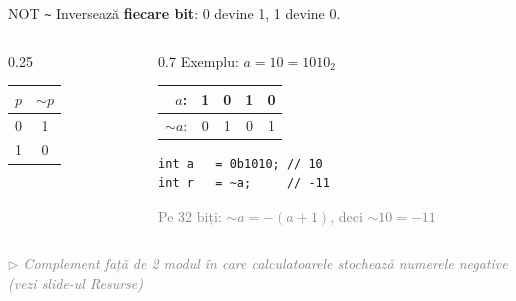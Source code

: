 \documentclass{beamer}
\newcommand{\beginnote}[1]{%
  \vfill
  {\footnotesize\textcolor{gray}{\textit{$\triangleright$ #1 (vezi slide-ul \emph{Resurse})}}}%
}
\begin{document}
\begin{frame}[fragile]{NOT \textemdash{} \texttt{\textasciitilde}}
  Inversează \textbf{fiecare bit}: 0 devine 1, 1 devine 0.
  \bigskip
  \begin{columns}[T]
    \begin{column}{0.25\textwidth}
      \begin{center}
      \begin{tabular}{cc}
        \toprule
        $p$ & $\sim p$ \\
        \midrule
        0 & 1 \\
        1 & 0 \\
        \bottomrule
      \end{tabular}
      \end{center}
    \end{column}
    \begin{column}{0.7\textwidth}
      Exemplu: $a = 10 = 1010_2$
      \begin{center}
      \begin{tabular}{rcccc}
        $a$:     & 1 & 0 & 1 & 0 \\
        \hline
        $\sim a$: & 0 & 1 & 0 & 1 \\
      \end{tabular}
      \end{center}
      \begin{center}
      \begin{lstlisting}
int a   = 0b1010; // 10
int r   = ~a;     // -11
      \end{lstlisting}
      \end{center}
      {\footnotesize\textcolor{gray}{Pe 32 biți: $\sim a = -(a+1)$, deci $\sim 10 = -11$}}
    \end{column}
  \end{columns}
  \beginnote{Complement față de 2 \textemdash{} modul în care calculatoarele stochează numerele negative}
\end{frame}
\end{document}
